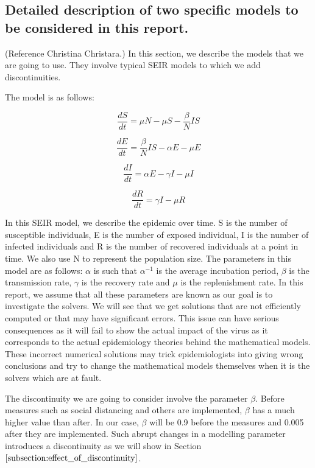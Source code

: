 \subsection{Detailed description of two specific models to be considered in this report.} 
\label{subsection:SEIR_model}
(Reference Christina Christara.)
In this section, we describe the models that we are going to use. They involve typical SEIR models to which we add discontinuities.

The model is as follows:

\begin{equation}
\frac{\textit{d}S}{\textit{dt}} = \mu N - \mu S - \frac{\beta}{N}IS \nonumber
\end{equation}

\begin{equation}
\frac{\textit{d}E}{\textit{dt}} = \frac{\beta}{N}IS - \alpha E - \mu E \nonumber
\end{equation}

\begin{equation}
\frac{\textit{d}I}{\textit{dt}} = \alpha E - \gamma I - \mu I \nonumber
\end{equation}

\begin{equation}
\frac{\textit{d}R}{\textit{dt}} = \gamma I - \mu R \nonumber
\end{equation} 

In this SEIR model, we describe the epidemic over time. S is the number of susceptible individuals, E is the number of exposed individual, I is the number of infected individuals and R is the number of recovered individuals at a point in time. We also use N to represent the population size.
The parameters in this model are as follows: $\alpha$ is such that $\alpha^{-1}$ is the average incubation period, $\beta$ is the transmission rate, $\gamma$ is the recovery rate and $\mu$ is the replenishment rate. In this report, we assume that all these parameters are known as our goal is to investigate the solvers. We will see that we get solutions that are not efficiently computed or that may have significant errors. This issue can have serious consequences as it will fail to show the actual impact of the virus as it corresponds to the actual epidemiology theories behind the mathematical models. These incorrect numerical solutions may trick epidemiologists into giving wrong conclusions and try to change the mathematical models themselves when it is the solvers which are at fault.

The discontinuity we are going to consider involve the parameter $\beta$.
Before measures such as social distancing and others are implemented, $\beta$ has a much higher value than after. In our case, $\beta$ will be 0.9 before the measures and 0.005 after they are implemented. Such abrupt changes in a modelling parameter introduces a discontinuity as we will show in Section $\ref{subsection:effect_of_discontinuity}$. 

